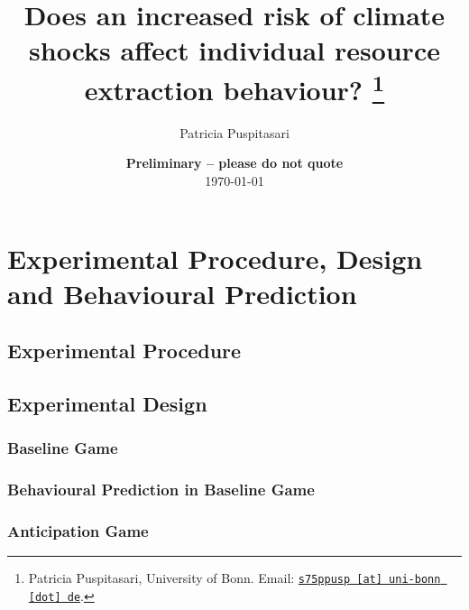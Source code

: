 \documentclass[11pt, a4paper, leqno]{article}
\begin{document}
\title{Does an increased risk of climate shocks affect individual resource extraction behaviour?
\thanks{Patricia Puspitasari, University of Bonn. Email: \href{mailto:s75ppusp@uni-bonn.de}{\nolinkurl{s75ppusp [at] uni-bonn [dot] de}}.}}

\author{Patricia Puspitasari}

\date{
    {\bf Preliminary -- please do not quote}
    \\[1ex]
    \today
}

\maketitle


\begin{abstract}
    
\end{abstract}

\clearpage

\section{Experimental Procedure, Design and Behavioural Prediction }\label{main:section3}
    \subsection{Experimental Procedure}\label{main:section31}
        

    \subsection{Experimental Design}\label{main:section32}
        
            \subsubsection{Baseline Game}\label{main:section32a}
                
            \subsubsection{Behavioural Prediction in Baseline Game}\label{main:section32b}
                
            \subsubsection{Anticipation Game}\label{main:section33a}
                
\end{document}
